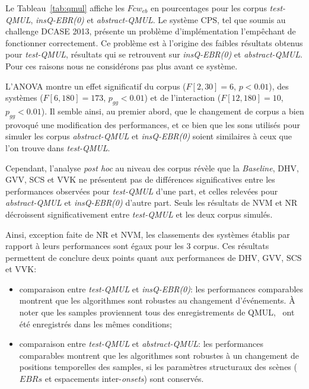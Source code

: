 Le Tableau~\ref{tab:qmul} affiche les $Fcw_{eb}$ en pourcentages pour les corpus \emph{test-QMUL}, \emph{insQ-EBR(0)} et \emph{abstract-QMUL}. Le système CPS, tel que soumis au challenge DCASE 2013, présente un problème d'implémentation l'empêchant de fonctionner correctement. Ce problème est à l'origine des faibles résultats obtenus pour \emph{test-QMUL}, résultats qui se retrouvent sur \emph{insQ-EBR(0)} et \emph{abstract-QMUL}. Pour ces raisons nous ne considérons pas plus avant ce système.

L'ANOVA montre un effet significatif du corpus  ($F[2,30]=6$, $p<0.01$), des systèmes  ($F[6,180]=173$, $p_{gg}<0.01$) et de l'interaction  ($F[12,180]=10$, $p_{gg}<0.01$). Il semble ainsi, au premier abord, que le changement de corpus a bien provoqué une modification des performances, et ce bien que les sons utilisés pour simuler les corpus \emph{abstract-QMUL} et \emph{insQ-EBR(0)} soient similaires à ceux que l'on trouve dans \emph{test-QMUL}.

Cependant, l'analyse \emph{post hoc} au niveau des corpus révèle que la \emph{Baseline}, DHV, GVV, SCS et VVK ne présentent pas de différences significatives entre les performances observées pour \emph{test-QMUL} d'une part, et celles relevées pour \emph{abstract-QMUL} et \emph{insQ-EBR(0)} d'autre part. Seuls les résultats de NVM et NR décroissent significativement entre \emph{test-QMUL} et les deux corpus simulés.

Ainsi, exception faite de NR et NVM, les classements des systèmes établis par rapport à leurs performances sont égaux pour les 3 corpus. Ces résultats permettent de conclure deux points quant aux performances de DHV, GVV, SCS et VVK:

\begin{itemize}
\item comparaison entre \emph{test-QMUL} et \emph{insQ-EBR(0)}: les performances comparables montrent que les algorithmes sont robustes au changement d'événements. À noter que les samples proviennent tous des enregistrements de QMUL, \ie~ont été enregistrés dans les mêmes conditions;
\item comparaison entre \emph{test-QMUL} et \emph{abstract-QMUL}: les performances comparables montrent que les algorithmes sont robustes à un changement de positions temporelles des samples, si les paramètres structuraux des scènes ($EBRs$ et espacements inter-\emph{onsets}) sont conservés.
\end{itemize}
  
